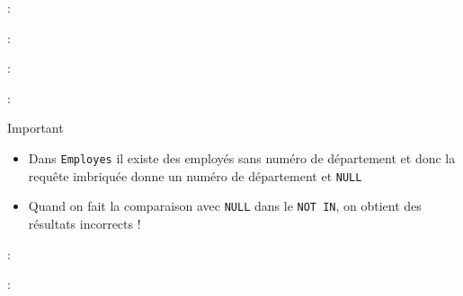 \documentclass[10pt]{beamer}
\begin{document}
\begin{frame}{\secname : \subsecname}
    
\end{frame}

\begin{frame}{\secname : \subsecname}
    
\end{frame}

\begin{frame}{\secname : \subsecname}
    
\end{frame}

\begin{frame}{\secname : \subsecname}
    \begin{alertblock}{Important}
        \begin{itemize}
            \item Dans \lstinline[language=plsql]!Employes! il existe des employés sans numéro de département et donc la requête imbriquée donne un numéro de département et \lstinline[language=plsql]!NULL!
            \item Quand on fait la comparaison avec \lstinline[language=plsql]!NULL! dans le \lstinline[language=plsql]!NOT IN!, on obtient des résultats incorrects !
        \end{itemize}
    \end{alertblock}
\end{frame}

\begin{frame}{\secname : \subsecname}
    
\end{frame}

\begin{frame}{\secname : \subsecname}
    
\end{frame}
\end{document}
